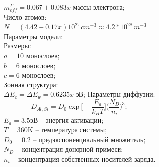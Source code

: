 \documentclass[10pt,pdf,hyperref={unicode},aspectratio={169}]{beamer}
\begin{document}
\begin{frame}
\begin{columns}
		\scriptsize
			$m_{eff}^{\Gamma} = 0.067+0.083x$ массы электрона;\\
		{\color{red}\footnotesize Число атомов:}\\
		\scriptsize
			$N = (4.42-0.17x)10^{22}\,cm^{-3} \approx 4.2*10^{28}\,m^{-3}$\\
		{\color{blue} Параметры модели:}\\
		{\color{red}\footnotesize Размеры:}\\
		\scriptsize
			$a = 10$ монослоев;\\
			$b = 6$ монослоев;\\
			$c = 6$ монослоев;\\
		{\color{red}\footnotesize Зонная структура:}\\
			$\Delta E_{c} = \Delta E_{w} = 0.6235x$ эВ;
		{\color{blue} Параметры диффузии:}
		\scriptsize
		\begin{equation*}
			D_{Al,Si} = D_{0}\exp\bigg[-\frac{E_{a}}{k_{B}T}\bigg]\Big( \frac{N_{D}}{n_{i}} \Big)^{3};
		\end{equation*}
		$E_{a} = 3.5$эВ -- энергия активации;\\
		$T = 360$K -- температура системы;\\
		$D_{0} = 0.2$ -- предэкспоненциальный множитель;\\
		$N_{D}$ -- концентрация донорной примеси;\\
		$n_{i}$ -- концентрация собственных носителей заряда.
	\end{columns}
\end{frame}
\end{document}
